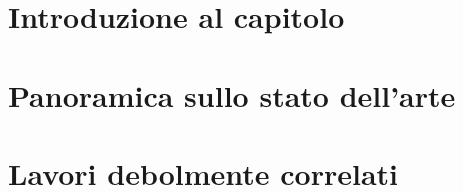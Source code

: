 \section{Introduzione al capitolo}

%
%
%
%
%
%
%

\section{Panoramica sullo stato dell'arte}


\section{Lavori debolmente correlati}


